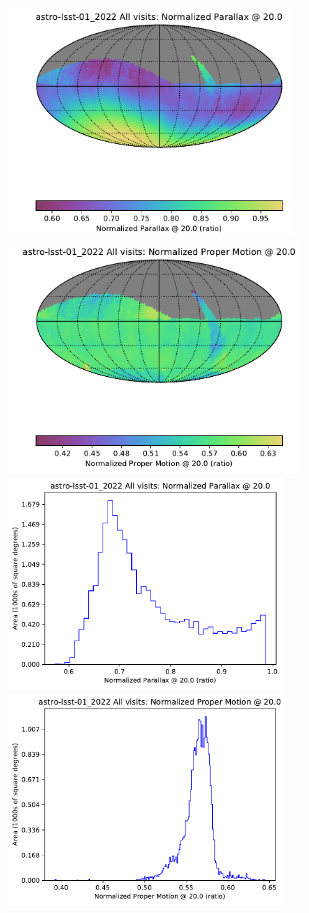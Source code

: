 \documentclass[DM,authoryear,toc]{lsstdoc}
\begin{document}
\begin{figure}[htb]
\centering
\includegraphics[height=2.4in]{figures/astro-lsst-01_2022_Normalized_Parallax_@_20_0_All_visits_HEAL_SkyMap}
\includegraphics[height=2.4in]{figures/astro-lsst-01_2022_Normalized_Proper_Motion_@_20_0_All_visits_HEAL_SkyMap} \\
\includegraphics[height=2.2in]{figures/astro-lsst-01_2022_Normalized_Parallax_@_20_0_All_visits_HEAL_Histogram}
\includegraphics[height=2.2in]{figures/astro-lsst-01_2022_Normalized_Proper_Motion_@_20_0_All_visits_HEAL_Histogram}

\end{figure}
\end{document}
